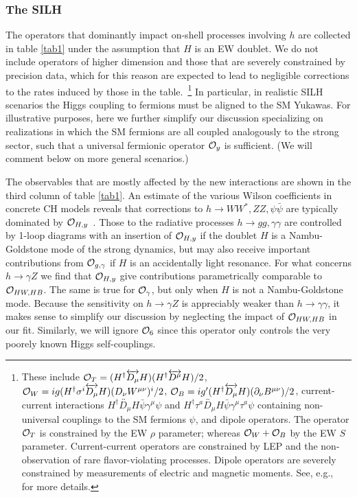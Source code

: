 




\subsubsection*{The SILH}

The operators that dominantly impact on-shell processes involving $h$ are collected in table \ref{tab1} under the assumption that $H$ is an EW doublet. We do not include operators of higher dimension and those that are severely constrained by precision data, which for this reason are expected to lead to negligible corrections to the rates induced by those in the table.~\footnote{These include ${\cal O}_T=(H^\dagger\overleftrightarrow{D_\mu}H)(H^\dagger\overleftrightarrow{D^\mu}H)/2$, ${\cal O}_W={i}g(H^\dagger\sigma^i\overleftrightarrow{D_\mu} H)(D_\nu W^{\mu\nu})^i/2$, ${\cal O}_B=ig'(H^\dagger\overleftrightarrow{D_\mu} H)(\partial_\nu B^{\mu\nu})/2$, current-current interactions $H^\dagger \overleftrightarrow{D_\mu}H \bar \psi\gamma^\mu \psi$ and $H^\dagger \tau^a\overleftrightarrow{D_\mu}H \bar \psi\gamma^\mu \tau^a\psi$ containing non-universal couplings to the SM fermions $\psi$, and dipole operators. The operator ${\cal O}_T$ is constrained by the EW $\rho$ parameter; whereas ${\cal O}_W+{\cal O}_B$ by the EW $S$ parameter. Current-current operators are constrained by LEP and the non-observation of rare flavor-violating processes. Dipole operators are severely constrained by measurements of electric and magnetic moments. See, e.g.,~\cite{Contino:2013kra} for more details.%
} In particular, in realistic SILH scenarios the Higgs coupling to fermions must be aligned to the SM Yukawas. For illustrative purposes, here we further simplify our discussion specializing on realizations in which the SM fermions are all coupled analogously to the strong sector, such that a universal fermionic operator ${\cal O}_y$ is sufficient. (We will comment below on more general scenarios.)

The observables that are mostly affected by the new interactions are shown in the third column of table \ref{tab1}. An estimate of the various Wilson coefficients in concrete CH models reveals that corrections to $h\to WW^*,ZZ,\psi\bar\psi$ are typically dominated by ${\cal O}_{H,y}$~\cite{Giudice:2007fh}. Those to the radiative processes $h\to gg,\gamma\gamma$ are controlled by 1-loop diagrams with an insertion of ${\cal O}_{H,y}$ if the doublet $H$ is a Nambu-Goldstone mode of the strong dynamics, but may also receive important contributions from ${\cal O}_{g,\gamma}$ if $H$ is an accidentally light resonance. For what concerns $h\to\gamma Z$ we find that ${\cal O}_{H,y}$ give contributions parametrically comparable to ${\cal O}_{HW, HB}$. The same is true for ${\cal O}_{\gamma}$, but only when $H$ is not a Nambu-Goldstone mode. Because the sensitivity on $h\to\gamma Z$ is appreciably weaker than $h\to\gamma\gamma$, it makes sense to simplify our discussion by neglecting the impact of ${\cal O}_{HW, HB}$ in our fit. Similarly, we will ignore ${\cal O}_6$ since this operator only controls the very poorely known Higgs self-couplings.

